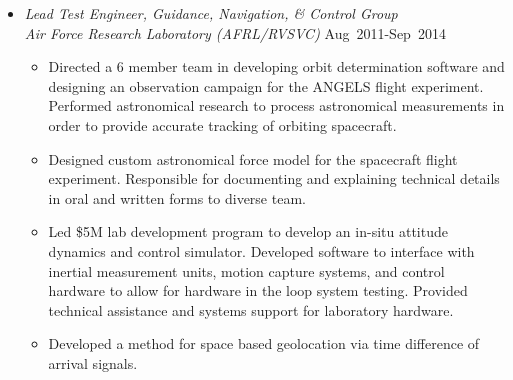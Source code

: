 \begin{itemize}
\item[] \textit{Lead Test Engineer, Guidance, Navigation, \& Control Group \\
    Air Force Research Laboratory (AFRL/RVSVC)}%
    \hfill {Aug~2011-Sep~2014}
\begin{itemize}
    \item Directed a 6 member team in developing orbit determination software and designing an observation campaign for the ANGELS flight experiment.
        Performed astronomical research to process  astronomical measurements in order to provide accurate tracking of orbiting spacecraft.
    \item Designed custom astronomical force model for the spacecraft flight experiment.
        Responsible for documenting and explaining technical details in oral and written forms to diverse team.
    \item Led \$5M lab development program to develop an in-situ attitude dynamics and control simulator.  
    Developed software to interface with inertial measurement units, motion capture systems, and control hardware to allow for hardware in the loop system testing.
    Provided technical assistance and systems support for laboratory hardware.
    \item Developed a method for space based geolocation via time difference of arrival signals.

\end{itemize}
\end{itemize}
